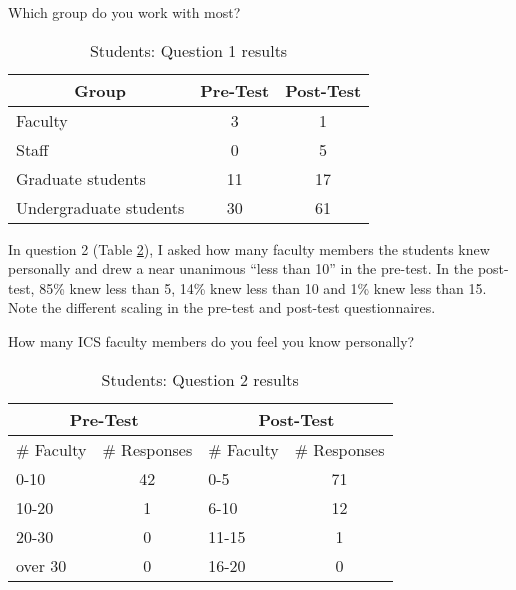 \begin{table}[htb]
\caption{Students: Question 1 results}
\begin{center}
{Which group do you work with most?}\\[1ex]
\begin{tabular}{|l|c|c|} \hline
 \multicolumn{1}{|c|}{\rule[-2mm]{0mm}{6mm}\bf Group} & 
 \multicolumn{1}{|c|}{\rule[-2mm]{0mm}{6mm}\bf Pre-Test} &
 \multicolumn{1}{|c|}{\rule[-2mm]{0mm}{6mm}\bf Post-Test} \\ \hline
 Faculty & \multicolumn{1}{|c|}{3} & \multicolumn{1}{|c|}{1} \\ \hline 
 Staff   & \multicolumn{1}{|c|}{0} & \multicolumn{1}{|c|}{5} \\ \hline 
 Graduate students & \multicolumn{1}{|c|}{11} & \multicolumn{1}{|c|}{17} \\ \hline 
 Undergraduate students & \multicolumn{1}{|c|}{30} & \multicolumn{1}{|c|}{61} \\ \hline
\end{tabular}
\end{center}
\label{tab:question1s}
\end{table}

In question 2 (Table \ref{tab:question2s}), I asked how many faculty members
the students knew personally and drew a near unanimous ``less than 10'' in the
pre-test.  In the post-test, 85\% knew less than 5, 14\% knew less than 10 and
1\% knew less than 15.  Note the different scaling in the pre-test and
post-test questionnaires.

\begin{table}[htb]
\caption{Students: Question 2 results}
{How many ICS faculty members do you feel you know personally?}
\begin{center}
\begin{tabular}{|l|l|l|l|} \hline
 \multicolumn{2}{|c|}{\rule[-2mm]{0mm}{6mm}\bf Pre-Test} &
 \multicolumn{2}{|c|}{\rule[-2mm]{0mm}{6mm}\bf Post-Test} \\ \hline
 \# Faculty & \# Responses & \# Faculty & \# Responses \\ \hline
 0-10    & \multicolumn{1}{|c|}{42} & 0-5 &\multicolumn{1}{|c|}{71} \\ \hline 
 10-20   & \multicolumn{1}{|c|}{1} & 6-10 & \multicolumn{1}{|c|}{12} \\ \hline 
 20-30   & \multicolumn{1}{|c|}{0} & 11-15 & \multicolumn{1}{|c|}{1} \\ \hline 
 over 30 & \multicolumn{1}{|c|}{0} & 16-20 & \multicolumn{1}{|c|}{0} \\ \hline
\end{tabular}
\end{center}
\label{tab:question2s}
\end{table}

